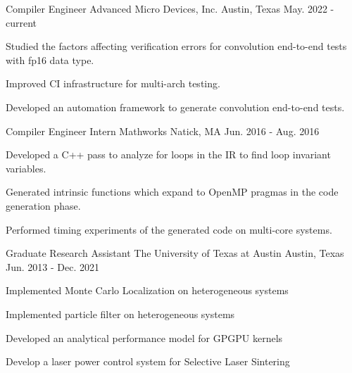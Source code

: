 

\begin{cventries}

  \cventry
    {Compiler Engineer} %
    {Advanced Micro Devices, Inc.} %
    {Austin, Texas} %
    {May. 2022 - current} %
    {
      \begin{cvitems} %
      \item {Studied the factors affecting verification errors for convolution end-to-end tests with fp16 data type.}
      \item {Improved CI infrastructure for multi-arch testing.}
      \item {Developed an automation framework to generate convolution end-to-end tests.}
      \end{cvitems}
    }

  \cventry
    {Compiler Engineer Intern} %
    {Mathworks} %
    {Natick, MA} %
    {Jun. 2016 - Aug. 2016} %
    {
      \begin{cvitems} %
      \item Developed a C++ pass to analyze for loops in the IR to find loop invariant
        variables.
      \item Generated intrinsic functions which expand to OpenMP pragmas in the code
        generation phase.
      \item Performed timing experiments of the generated code on multi-core systems.
      \end{cvitems}
    }

  \cventry
    {Graduate Research Assistant}
    {The University of Texas at Austin}
    {Austin, Texas}
    {Jun. 2013 - Dec. 2021}
    {
      \begin{cvitems}
      \item {Implemented Monte Carlo Localization on heterogeneous systems}
      \item {Implemented particle filter on heterogeneous systems}
      \item {Developed an analytical performance model for GPGPU kernels} %
      \item {Develop a laser power control system for Selective Laser Sintering} %
      \end{cvitems}
    }
\end{cventries}
